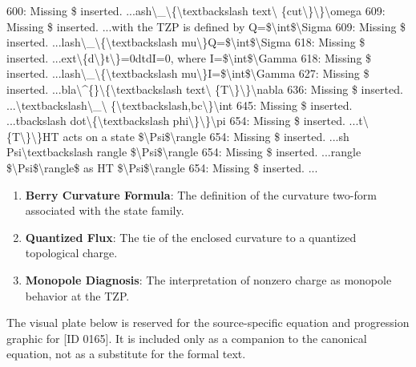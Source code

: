 600: Missing \$ inserted. ...ash\textbackslash{}\_\textbackslash{}\{\textbackslash{}textbackslash text\textbackslash{} \{cut\textbackslash{}\}\textbackslash{}\}\textbackslash{}omega 609: Missing \$ inserted. ...with the TZP is defined by Q=\$\textbackslash{}int\$\textbackslash{}Sigma 609: Missing \$ inserted. ...lash\textbackslash{}\_\textbackslash{}\{\textbackslash{}textbackslash mu\textbackslash{}\}Q=\$\textbackslash{}int\$\textbackslash{}Sigma 618: Missing \$ inserted. ...ext\textbackslash{}\{d\textbackslash{}\}t\textbackslash{}\}=0dtdI=0, where I=\$\textbackslash{}int\$\textbackslash{}Gamma 618: Missing \$ inserted. ...lash\textbackslash{}\_\textbackslash{}\{\textbackslash{}textbackslash mu\textbackslash{}\}I=\$\textbackslash{}int\$\textbackslash{}Gamma 627: Missing \$ inserted. ...bla\textbackslash{}\textasciicircum{}\{\}\textbackslash{}\{\textbackslash{}textbackslash text\textbackslash{} \{T\textbackslash{}\}\textbackslash{}\}\textbackslash{}nabla 636: Missing \$ inserted. ...\textbackslash{}textbackslash\textbackslash{}\_\textbackslash{} \{\textbackslash{}textbackslash,bc\textbackslash{}\}\textbackslash{}int 645: Missing \$ inserted. ...tbackslash dot\textbackslash{}\{\textbackslash{}textbackslash phi\textbackslash{}\}\textbackslash{}\}\textbackslash{}pi 654: Missing \$ inserted. ...t\textbackslash{}\{T\textbackslash{}\}\textbackslash{}\}HT acts on a state  \$\textbackslash{}Psi\$\textbackslash{}rangle 654: Missing \$ inserted. ...sh Psi\textbackslash{}textbackslash rangle \$\textbackslash{}Psi\$\textbackslash{}rangle 654: Missing \$ inserted. ...rangle \$\textbackslash{}Psi\$\textbackslash{}rangle\$ as HT \$\textbackslash{}Psi\$\textbackslash{}rangle 654: Missing \$ inserted. ...
\endgroup

\begin{enumerate}[leftmargin=1.6em,itemsep=6pt,topsep=4pt]
\item \textbf{Berry Curvature Formula}: The definition of the curvature two-form associated with the state family.
\item \textbf{Quantized Flux}: The tie of the enclosed curvature to a quantized topological charge.
\item \textbf{Monopole Diagnosis}: The interpretation of nonzero charge as monopole behavior at the TZP.
\end{enumerate}

\begingroup\footnotesize\sloppy
The visual plate below is reserved for the source-specific equation and progression graphic for [ID 0165]. It is included only as a companion to the canonical equation, not as a substitute for the formal text.
\par\endgroup
\ifTZPDarkEdition
{}
\fi

